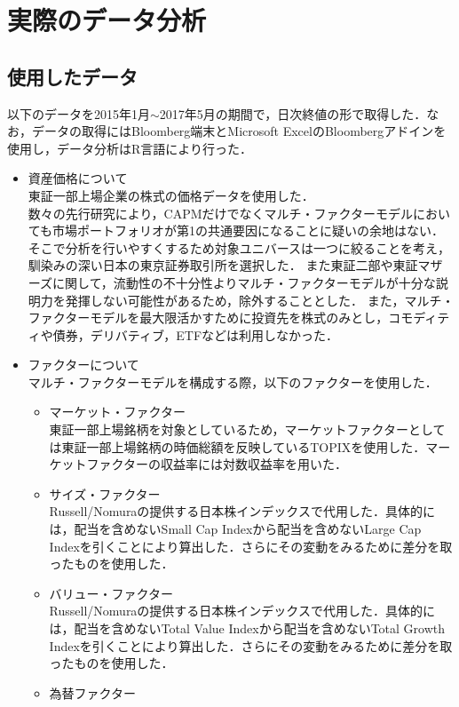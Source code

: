 \documentclass[11pt]{jreport}
\begin{document}
\chapter{実際のデータ分析}
\section{使用したデータ}
以下のデータを2015年1月$\sim$2017年5月の期間で，日次終値の形で取得した．なお，データの取得にはBloomberg端末とMicrosoft ExcelのBloombergアドインを使用し，データ分析はR言語により行った．
\begin{itemize}
\item 資産価格について\\
\quad 東証一部上場企業の株式の価格データを使用した．\\
\quad 数々の先行研究により，CAPMだけでなくマルチ・ファクターモデルにおいても市場ポートフォリオが第1の共通要因になることに疑いの余地はない．
そこで分析を行いやすくするため対象ユニバースは一つに絞ることを考え，馴染みの深い日本の東京証券取引所を選択した．
また東証二部や東証マザーズに関して，流動性の不十分性よりマルチ・ファクターモデルが十分な説明力を発揮しない可能性があるため，除外することとした．
また，マルチ・ファクターモデルを最大限活かすために投資先を株式のみとし，コモディティや債券，デリバティブ，ETFなどは利用しなかった．
\item ファクターについて\\
マルチ・ファクターモデルを構成する際，以下のファクターを使用した．
\begin{itemize}
\item マーケット・ファクター\\
東証一部上場銘柄を対象としているため，マーケットファクターとしては東証一部上場銘柄の時価総額を反映しているTOPIXを使用した．マーケットファクターの収益率には対数収益率を用いた．
\item サイズ・ファクター\\
Russell/Nomuraの提供する日本株インデックスで代用した．具体的には，配当を含めないSmall Cap Indexから配当を含めないLarge Cap Indexを引くことにより算出した．さらにその変動をみるために差分を取ったものを使用した．
\item バリュー・ファクター\\
Russell/Nomuraの提供する日本株インデックスで代用した．具体的には，配当を含めないTotal Value Indexから配当を含めないTotal Growth Indexを引くことにより算出した．さらにその変動をみるために差分を取ったものを使用した．
\item 為替ファクター\\

\end{itemize}
\end{itemize}
\end{document}
